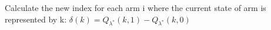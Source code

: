 \documentclass{slides}
\begin{document}
{\begin{algorithm}[H]
\begin{small}
\begin{algorithmic}[1]
                
    \EndFor
    \State Calculate the new index for each arm i where the current state of arm is represented by k:
        \Statex\hspace*{5mm} $\delta(k)=Q_{\lambda^*}(k,1)-Q_{\lambda^*}(k,0)$
\end{algorithmic}
\end{small}
\end{algorithm}

}
\end{document}
